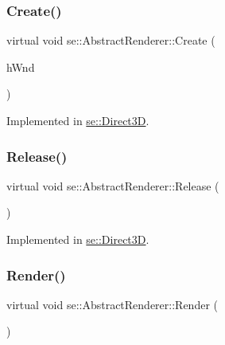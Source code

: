 \subsubsection{\texorpdfstring{Create()}{Create()}}
{\footnotesize\ttfamily virtual void se\+::\+Abstract\+Renderer\+::\+Create (\begin{DoxyParamCaption}\item[{H\+W\+ND}]{h\+Wnd }\end{DoxyParamCaption})\hspace{0.3cm}{\ttfamily [pure virtual]}}



Implemented in \mbox{\hyperlink{classse_1_1_direct3_d_a316456762829db0614077cccd655e654}{se\+::\+Direct3D}}.

\mbox{\label{classse_1_1_abstract_renderer_a98e35b7db62827580573185ed91b25bb}} 
\subsubsection{\texorpdfstring{Release()}{Release()}}
{\footnotesize\ttfamily virtual void se\+::\+Abstract\+Renderer\+::\+Release (\begin{DoxyParamCaption}{ }\end{DoxyParamCaption})\hspace{0.3cm}{\ttfamily [pure virtual]}}



Implemented in \mbox{\hyperlink{classse_1_1_direct3_d_ae2979f16a5c35773cf2c243d8e6f90e4}{se\+::\+Direct3D}}.

\mbox{\label{classse_1_1_abstract_renderer_a08f813c33edad06bf7d379f8257895e6}} 
\subsubsection{\texorpdfstring{Render()}{Render()}}
{\footnotesize\ttfamily virtual void se\+::\+Abstract\+Renderer\+::\+Render (\begin{DoxyParamCaption}{ }\end{DoxyParamCaption})\hspace{0.3cm}{\ttfamily [pure virtual]}}



